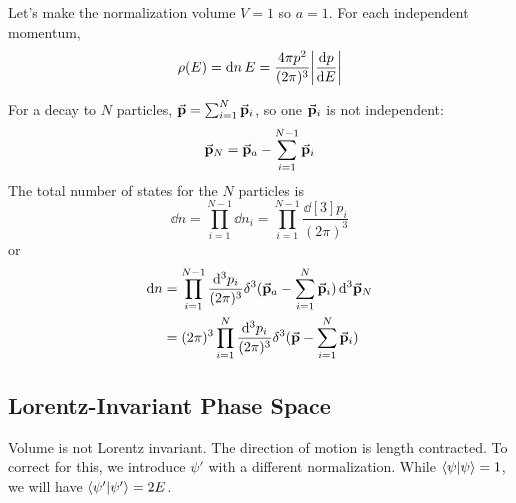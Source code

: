 \documentclass[a4paper,twoside,master.tex]{subfiles}
\begin{document}
Let's make the normalization volume $ V = 1 $ so $ a = 1 $. For each independent momentum,
\begin{equation}
    \rho(E) = \dd{n}{E} = \frac{4 \pi p^2}{(2 \pi)^3} \abs{\dv{p}{E}}
\end{equation}

For a decay to $ N $ particles, $ \va{p} = \sum_{i=1}^{N} \va{p}_i $, so one $ \va{p}_i $ is not independent:
\begin{equation}
    \va{p}_N = \va{p}_a - \sum_{i=1}^{N-1} \va{p}_i
\end{equation}
The total number of states for the $ N $ particles is
\begin{equation}
    \dd{n} = \prod_{i=1}^{N-1} \dd{n_i} = \prod_{i=1}^{N-1} \frac{\dd[3]{p_i}}{(2 \pi)^3} 
\end{equation}
or
\begin{align}
    \dd{n} &= \prod_{i=1}^{N-1} \frac{\dd[3]{p_i}}{(2 \pi)^3} \delta^3(\va{p}_a - \sum_{i=1}^{N} \va{p}_i) \dd[3]{\va{p}_N} \\
    &= (2 \pi)^3 \prod_{i=1}^{N} \frac{\dd[3]{p_i}}{(2 \pi)^3} \delta^3(\va{p} - \sum_{i=1}^{N} \va{p}_i)
\end{align}

\subsection{Lorentz-Invariant Phase Space}\label{sub:lorentz-invariant_phase_space}

Volume is not Lorentz invariant. The direction of motion is length contracted. To correct for this, we introduce $ \psi' $ with a different normalization. While $\bra{\psi}\ket{\psi} = 1 $, we will have $\bra{\psi'}\ket{\psi'} = 2E $.
\end{document}
